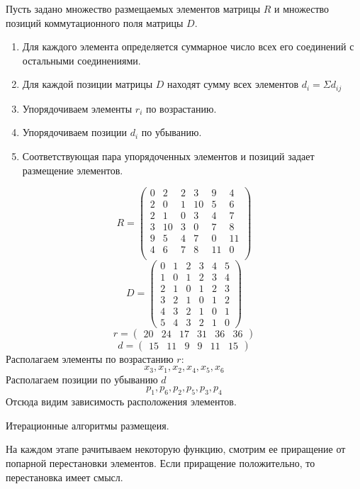 \documentclass{article}
\begin{document}
	Пусть задано множество размещаемых элементов матрицы $R$ и множество позиций коммутационного поля матрицы $D$.
	\begin{enumerate}
		\item Для каждого элемента определяется суммарное число всех его соединений с остальными соединениями.
		\item Для каждой позиции матрицы $D$ находят сумму всех элементов $d_i = \Sigma d_{ij}$
		\item Упорядочиваем элементы $r_i$ по возрастанию.
		\item Упорядочиваем позиции $d_i$ по убыванию.
		\item Соответствующая пара упорядоченных элементов и позиций задает размещение элементов.
	\end{enumerate}
	$$
	R =
	\begin{pmatrix}
		0 & 2 & 2 & 3 & 9 & 4\\
		2 & 0 & 1 & 10 & 5 & 6\\
		2 & 1 & 0 & 3 & 4 & 7\\
		3 & 10 & 3 & 0 & 7 & 8\\
		9 & 5 & 4 & 7 & 0 & 11\\
		4 & 6 & 7 & 8 & 11 & 0\\
	\end{pmatrix}
	$$
	$$
	D =
	\begin{pmatrix}
		0 & 1 & 2 & 3 & 4 & 5\\
		1 & 0 & 1 & 2 & 3 & 4\\
		2 & 1 & 0 & 1 & 2 & 3\\
		3 & 2 & 1 & 0 & 1 & 2\\
		4 & 3 & 2 & 1 & 0 & 1\\
		5 & 4 & 3 & 2 & 1 & 0
	\end{pmatrix}
	$$
	$$
	r = 
	\begin{pmatrix}
		20 & 24 & 17 & 31 & 36 & 36
	\end{pmatrix}
	$$
	$$
	d = 
	\begin{pmatrix}
		15 & 11 & 9 & 9 & 11 & 15
	\end{pmatrix}
	$$
	Располагаем элементы по возрастанию $r$:
	$$
	x_3, x_1, x_2, x_4, x_5, x_6
	$$
	Располагаем позиции по убыванию $d$
	$$
	p_1, p_6, p_2, p_5, p_3, p_4
	$$
	Отсюда видим зависимость расположения элементов.
	
	Итерационные алгоритмы размещеия.

	На каждом этапе рачитываем некоторую функцию, смотрим ее приращение от попарной перестановки элементов. Если приращение положительно, то перестановка имеет смысл.
\end{document}
